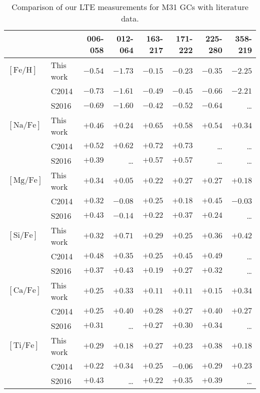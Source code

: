 \documentclass{aa}
\begin{document}
\begin{table*}
\caption{Comparison of our LTE measurements for M31 GCs with literature data.}
\label{tab:m31cmp}
\centering
{\small
\begin{tabular}{llrrrrrr}
\hline\hline
& & 006-058 & 012-064 & 163-217 &171-222 & 225-280 & 358-219 \\ \hline
$\mathrm{[Fe/H]}$ & 
This work & $-0.54$ & $-1.73$ & $-0.15$ & $-0.23$ & $-0.35$ & $-2.25$ \\
& C2014 & $-0.73$ & $-1.61$ & $-0.49$ & $-0.45$ & $-0.66$ & $-2.21$\\
& S2016 & $-0.69$ & $-1.60$ & $-0.42$ & $-0.52$ & $-0.64$ & \ldots \\
$\mathrm{[Na/Fe]}$ & 
This work & $+0.46$ & $+0.24$ & $+0.65$ & $+0.58$ & $+0.54$ & $+0.34$ \\
& C2014 & $+0.52$ & $+0.62$ & $+0.72$ & $+0.73$ & \ldots & \ldots \\
& S2016 & $+0.39$ & \ldots & $+0.57$ & $+0.57$ & \ldots & \ldots \\
$\mathrm{[Mg/Fe]}$ & 
This work & $+0.34$ & $+0.05$ & $+0.22$ & $+0.27$ & $+0.27$ & $+0.18$ \\
& C2014 & $+0.32$ & $-0.08$ & $+0.25$ & $+0.18$ & $+0.45$ & $-0.03$ \\
& S2016 & $+0.43$ & $-0.14$ & $+0.22$ & $+0.37$ & $+0.24$ & \ldots \\
$\mathrm{[Si/Fe]}$ & 
This work & $+0.32$ & $+0.71$ & $+0.29$ & $+0.25$ & $+0.36$ & $+0.42$ \\
& C2014 & $+0.48$ & $+0.35$ & $+0.25$ & $+0.45$ & $+0.49$ & \ldots \\
& S2016 & $+0.37$ & $+0.43$ & $+0.19$ & $+0.27$ & $+0.32$ & \ldots \\
$\mathrm{[Ca/Fe]}$ & 
This work & $+0.25$ & $+0.33$ & $+0.11$ & $+0.11$ & $+0.15$ & $+0.34$ \\
& C2014 & $+0.25$ & $+0.40$ & $+0.28$ & $+0.27$ & $+0.40$ & $+0.27$ \\
& S2016 & $+0.31$ & \ldots & $+0.27$ & $+0.30$ & $+0.34$ & \ldots \\
$\mathrm{[Ti/Fe]}$ & 
This work & $+0.29$ & $+0.18$ & $+0.27$ & $+0.23$ & $+0.38$ & $+0.18$ \\
& C2014 & $+0.22$ & $+0.34$ & $+0.25$ & $-0.06$ & $+0.29$ & $+0.23$ \\
& S2016 & $+0.43$ & \ldots & $+0.22$ & $+0.35$ & $+0.39$ & \ldots \\
\hline
\end{tabular}
}
\end{table*}
\end{document}
